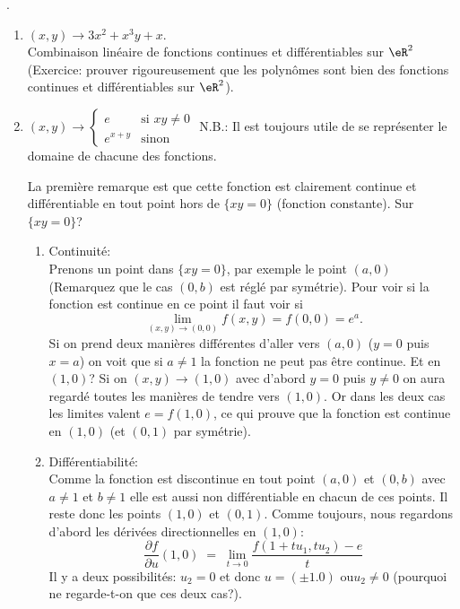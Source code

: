 .
\begin{enumerate}
	\item $(x,y)\rightarrow  3x^2+x^3y+x$.\\
	      Combinaison linéaire de fonctions continues et différentiables sur $\eR^2$ (Exercice: prouver rigoureusement que les polynômes sont bien des fonctions continues et différentiables sur $\eR^2$).


	\item \(  (x,y)\rightarrow\begin{cases}
		      e       & \text{si } xy\neq 0 \\
		      e^{x+y} & \text{sinon}
	      \end{cases}\)
	      N.B.: Il est toujours utile de se représenter le domaine de chacune des fonctions.

	      \noindent La première remarque est que cette fonction est clairement continue et différentiable en tout point hors de $\{xy=0\}$ (fonction constante). Sur $\{xy=0\}$?
	      \begin{enumerate}
		      \item Continuité:\\
		            Prenons un point dans $\{xy=0\}$, par exemple le point $(a,0)$ (Remarquez que le cas $(0,b)$ est réglé par symétrie). Pour voir si la fonction est continue en ce point il faut voir si \[\lim_{(x,y)\rightarrow (0,0)}f(x,y)=f(0,0)=e^a.\] Si on prend deux manières différentes d'aller vers $(a,0)$ ($y=0$ puis $x=a$) on voit que si $a \neq1$ la fonction ne peut pas être continue. Et en $(1,0)$? Si on $(x,y)\rightarrow (1,0)$ avec d'abord $y=0$ puis $y\neq0$ on aura regardé toutes les manières de tendre vers $(1,0)$. Or dans les deux cas les limites valent $e = f(1,0)$, ce qui prouve que la fonction est continue en $(1,0)$ (et $(0,1)$ par symétrie).

		      \item Différentiabilité:\\
		            Comme la fonction est discontinue en tout point $(a,0)$ et $(0,b)$ avec $a\neq1$ et $b\neq1$ elle est aussi non différentiable en chacun de ces points. Il reste donc les points $(1,0)$ et $(0,1)$. Comme toujours, nous regardons d'abord les dérivées directionnelles en $(1,0)$:
		            \[\frac{ \partial f }{ \partial u }(1,0) \;=\;\lim_{t\rightarrow 0}\frac{f(1+tu_1,tu_2)-e}{t}\]
		            Il y a deux possibilités: $u_2=0$ et donc $u=(\pm1.0)$ ou$u_2\neq0$ (pourquoi ne regarde-t-on que ces deux cas?).


\end{enumerate}
\end{enumerate}
